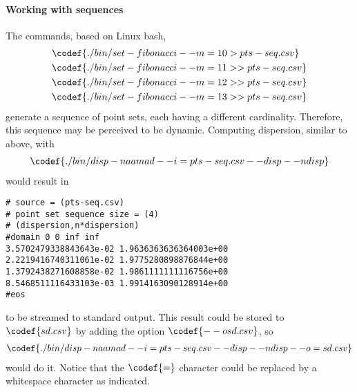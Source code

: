 \paragraph{Working with sequences}

The commands, based on Linux bash,
\begin{align*}
&\codef{./bin/set-fibonacci --m=10 > pts-seq.csv} \\
&\codef{./bin/set-fibonacci --m=11 >> pts-seq.csv} \\
&\codef{./bin/set-fibonacci --m=12 >> pts-seq.csv} \\
&\codef{./bin/set-fibonacci --m=13 >> pts-seq.csv}
\end{align*}
generate a sequence of point sets, each having a different cardinality. Therefore, this sequence may be perceived to be dynamic. Computing dispersion, similar to above, with
\begin{align*}
  \codef{./bin/disp-naamad --i=pts-seq.csv --disp --ndisp}
\end{align*}
would result in
\begin{verbatim}
# source = (pts-seq.csv)
# point set sequence size = (4)
# (dispersion,n*dispersion)
#domain 0 0 inf inf
3.5702479338843643e-02 1.9636363636364003e+00
2.2219416740311061e-02 1.9775280898876844e+00
1.3792438271608858e-02 1.9861111111116756e+00
8.5468511116433103e-03 1.9914163090128914e+00
#eos
\end{verbatim}
to be streamed to standard output. This result could be stored to $\codef{sd.csv}$ by adding the option $\codef{--o sd.csv}$, so
\begin{align*}
  \codef{./bin/disp-naamad --i=pts-seq.csv --disp --ndisp --o=sd.csv}
\end{align*}
would do it. Notice that the $\codef{=}$ character could be replaced by a whitespace character as indicated.
